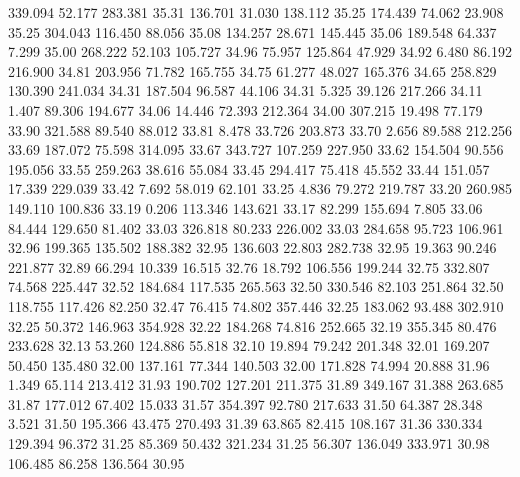  339.094   52.177  283.381        35.31
 136.701   31.030  138.112        35.25
 174.439   74.062   23.908        35.25
 304.043  116.450   88.056        35.08
 134.257   28.671  145.445        35.06
 189.548   64.337    7.299        35.00
 268.222   52.103  105.727        34.96
  75.957  125.864   47.929        34.92
   6.480   86.192  216.900        34.81
 203.956   71.782  165.755        34.75
  61.277   48.027  165.376        34.65
 258.829  130.390  241.034        34.31
 187.504   96.587   44.106        34.31
   5.325   39.126  217.266        34.11
   1.407   89.306  194.677        34.06
  14.446   72.393  212.364        34.00
 307.215   19.498   77.179        33.90
 321.588   89.540   88.012        33.81
   8.478   33.726  203.873        33.70
   2.656   89.588  212.256        33.69
 187.072   75.598  314.095        33.67
 343.727  107.259  227.950        33.62
 154.504   90.556  195.056        33.55
 259.263   38.616   55.084        33.45
 294.417   75.418   45.552        33.44
 151.057   17.339  229.039        33.42
   7.692   58.019   62.101        33.25
   4.836   79.272  219.787        33.20
 260.985  149.110  100.836        33.19
   0.206  113.346  143.621        33.17
  82.299  155.694    7.805        33.06
  84.444  129.650   81.402        33.03
 326.818   80.233  226.002        33.03
 284.658   95.723  106.961        32.96
 199.365  135.502  188.382        32.95
 136.603   22.803  282.738        32.95
  19.363   90.246  221.877        32.89
  66.294   10.339   16.515        32.76
  18.792  106.556  199.244        32.75
 332.807   74.568  225.447        32.52
 184.684  117.535  265.563        32.50
 330.546   82.103  251.864        32.50
 118.755  117.426   82.250        32.47
  76.415   74.802  357.446        32.25
 183.062   93.488  302.910        32.25
  50.372  146.963  354.928        32.22
 184.268   74.816  252.665        32.19
 355.345   80.476  233.628        32.13
  53.260  124.886   55.818        32.10
  19.894   79.242  201.348        32.01
 169.207   50.450  135.480        32.00
 137.161   77.344  140.503        32.00
 171.828   74.994   20.888        31.96
   1.349   65.114  213.412        31.93
 190.702  127.201  211.375        31.89
 349.167   31.388  263.685        31.87
 177.012   67.402   15.033        31.57
 354.397   92.780  217.633        31.50
  64.387   28.348    3.521        31.50
 195.366   43.475  270.493        31.39
  63.865   82.415  108.167        31.36
 330.334  129.394   96.372        31.25
  85.369   50.432  321.234        31.25
  56.307  136.049  333.971        30.98
 106.485   86.258  136.564        30.95
